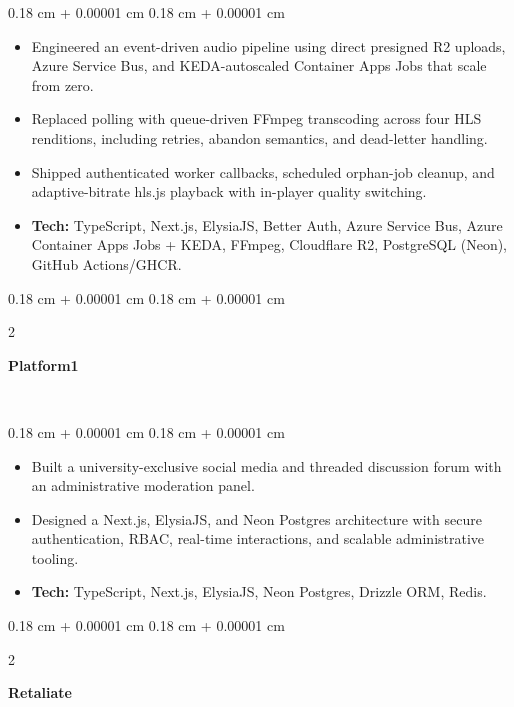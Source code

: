 \documentclass[10pt, letterpaper]{article}
\newenvironment{highlights}{
    \begin{itemize}[
        topsep=0.09 cm,
        parsep=0.09 cm,
        partopsep=0pt,
        itemsep=0pt,
        leftmargin=0.4 cm + 10pt
    ]
}{
    \end{itemize}
} %
\newenvironment{onecolentry}{
    \begin{adjustwidth}{
        0.18 cm + 0.00001 cm
    }{
        0.18 cm + 0.00001 cm
    }
}{
    \end{adjustwidth}
} %
\newenvironment{twocolentry}[2][]{
    \onecolentry
    \def\secondColumn{#2}
    \setcolumnwidth{\fill, 4.5 cm}
    \begin{paracol}{2}
}{
    \switchcolumn \raggedleft \secondColumn
    \end{paracol}
    \endonecolentry
} %
\let\hrefWithoutArrow\href
\renewcommand{\href}[2]{\hrefWithoutArrow{#1}{\ifthenelse{\equal{#2}{}}{ }{#2 }\raisebox{.15ex}{\footnotesize \faExternalLink*}}}
\begin{document}
\vspace{0.02 cm}
\begin{onecolentry}
    \begin{highlights}
        \item Engineered an event-driven audio pipeline using direct presigned R2 uploads, Azure Service Bus, and KEDA-autoscaled Container Apps Jobs that scale from zero.
        \item Replaced polling with queue-driven FFmpeg transcoding across four HLS renditions, including retries, abandon semantics, and dead-letter handling.
        \item Shipped authenticated worker callbacks, scheduled orphan-job cleanup, and adaptive-bitrate hls.js playback with in-player quality switching.
        \item \textbf{Tech:} TypeScript, Next.js, ElysiaJS, Better Auth, Azure Service Bus, Azure Container Apps Jobs + KEDA, FFmpeg, Cloudflare R2, PostgreSQL (Neon), GitHub Actions/GHCR.
    \end{highlights}
\end{onecolentry}

\vspace{0.05 cm}

\begin{twocolentry}{
\href{https://platform1.niravv.me}{\faGlobe} \ \href{https://github.com/ni3rav/platform1}{\faGithub}
}
    \textbf{Platform1}
\end{twocolentry}

\vspace{0.02 cm}
\begin{onecolentry}
    \begin{highlights}
        \item Built a university-exclusive social media and threaded discussion forum with an administrative moderation panel.
        \item Designed a Next.js, ElysiaJS, and Neon Postgres architecture with secure authentication, RBAC, real-time interactions, and scalable administrative tooling.
        \item \textbf{Tech:} TypeScript, Next.js, ElysiaJS, Neon Postgres, Drizzle ORM, Redis.
    \end{highlights}
\end{onecolentry}
\vspace{0.05 cm}


\begin{twocolentry}{
\href{https://stackblitz.com/edit/retaliate-live}{\faGlobe} \ \href{https://github.com/ni3rav/retaliate}{\faGithub}
}
    \textbf{Retaliate}
\end{twocolentry}
\end{document}
